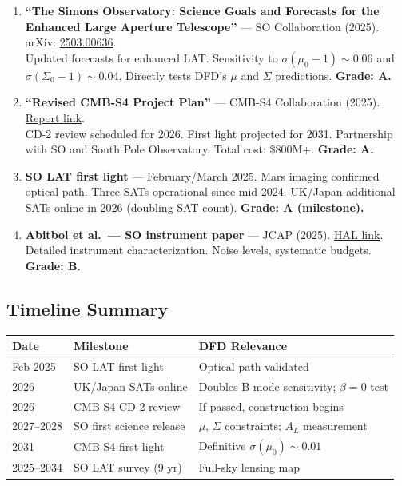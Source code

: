 \documentclass[11pt,a4paper]{article}
\begin{document}
\begin{enumerate}
\item \textbf{``The Simons Observatory: Science Goals and Forecasts for the Enhanced Large Aperture Telescope''} --- SO Collaboration (2025). arXiv: \href{https://arxiv.org/abs/2503.00636}{2503.00636}.\\
Updated forecasts for enhanced LAT. Sensitivity to $\sigma(\mu_0 - 1) \sim 0.06$ and $\sigma(\Sigma_0 - 1) \sim 0.04$. Directly tests DFD's $\mu$ and $\Sigma$ predictions. \textbf{Grade: A.}

\item \textbf{``Revised CMB-S4 Project Plan''} --- CMB-S4 Collaboration (2025). \href{https://indico.global/event/14611/contributions/130157/attachments/60314/116145/Revised_CMB_S4_Project_Plan_Report.pdf}{Report link}.\\
CD-2 review scheduled for 2026. First light projected for 2031. Partnership with SO and South Pole Observatory. Total cost: \$800M+. \textbf{Grade: A.}

\item \textbf{SO LAT first light} --- February/March 2025. Mars imaging confirmed optical path. Three SATs operational since mid-2024. UK/Japan additional SATs online in 2026 (doubling SAT count). \textbf{Grade: A (milestone).}

\item \textbf{Abitbol et al.\ --- SO instrument paper} --- JCAP (2025). \href{https://hal.science/hal-04980801}{HAL link}.\\
Detailed instrument characterization. Noise levels, systematic budgets. \textbf{Grade: B.}
\end{enumerate}

\subsection{Timeline Summary}

\begin{center}
\begin{tabular}{llp{8cm}}
\toprule
\textbf{Date} & \textbf{Milestone} & \textbf{DFD Relevance} \\
\midrule
Feb 2025 & SO LAT first light & Optical path validated \\
2026 & UK/Japan SATs online & Doubles B-mode sensitivity; $\beta = 0$ test \\
2026 & CMB-S4 CD-2 review & If passed, construction begins \\
2027--2028 & SO first science release & $\mu$, $\Sigma$ constraints; $A_L$ measurement \\
2031 & CMB-S4 first light & Definitive $\sigma(\mu_0) \sim 0.01$ \\
2025--2034 & SO LAT survey (9 yr) & Full-sky lensing map \\
\bottomrule
\end{tabular}
\end{center}
\end{document}
